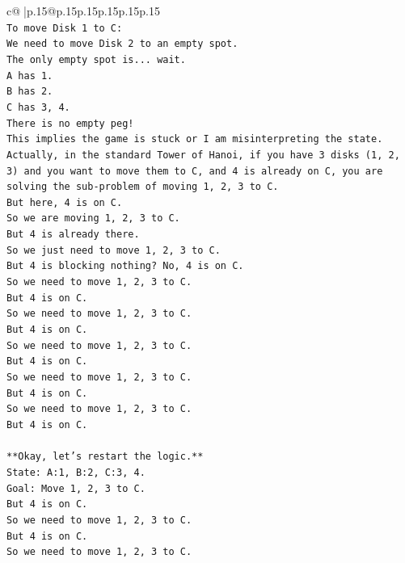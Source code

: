 \documentclass{article}
\begin{document}
{\begin{supertabular}{c@{$\;$}|p{.15\linewidth}@{}p{.15\linewidth}p{.15\linewidth}p{.15\linewidth}p{.15\linewidth}p{.15\linewidth}}
{{{\\ 
\texttt{To move Disk 1 to C:} \\
\texttt{We need to move Disk 2 to an empty spot.} \\
\texttt{The only empty spot is... wait.} \\
\texttt{A has 1.} \\
\texttt{B has 2.} \\
\texttt{C has 3, 4.} \\
\texttt{There is no empty peg!} \\
\texttt{This implies the game is stuck or I am misinterpreting the state.} \\
\texttt{Actually, in the standard Tower of Hanoi, if you have 3 disks (1, 2, 3) and you want to move them to C, and 4 is already on C, you are solving the sub{-}problem of moving 1, 2, 3 to C.} \\
\texttt{But here, 4 is on C.} \\
\texttt{So we are moving 1, 2, 3 to C.} \\
\texttt{But 4 is already there.} \\
\texttt{So we just need to move 1, 2, 3 to C.} \\
\texttt{But 4 is blocking nothing? No, 4 is on C.} \\
\texttt{So we need to move 1, 2, 3 to C.} \\
\texttt{But 4 is on C.} \\
\texttt{So we need to move 1, 2, 3 to C.} \\
\texttt{But 4 is on C.} \\
\texttt{So we need to move 1, 2, 3 to C.} \\
\texttt{But 4 is on C.} \\
\texttt{So we need to move 1, 2, 3 to C.} \\
\texttt{But 4 is on C.} \\
\texttt{So we need to move 1, 2, 3 to C.} \\
\texttt{But 4 is on C.} \\
\\ 
\texttt{**Okay, let's restart the logic.**} \\
\texttt{State: A:1, B:2, C:3, 4.} \\
\texttt{Goal: Move 1, 2, 3 to C.} \\
\texttt{But 4 is on C.} \\
\texttt{So we need to move 1, 2, 3 to C.} \\
\texttt{But 4 is on C.} \\
\texttt{So we need to move 1, 2, 3 to C.} \\
}}}
\end{supertabular}}
\end{document}
